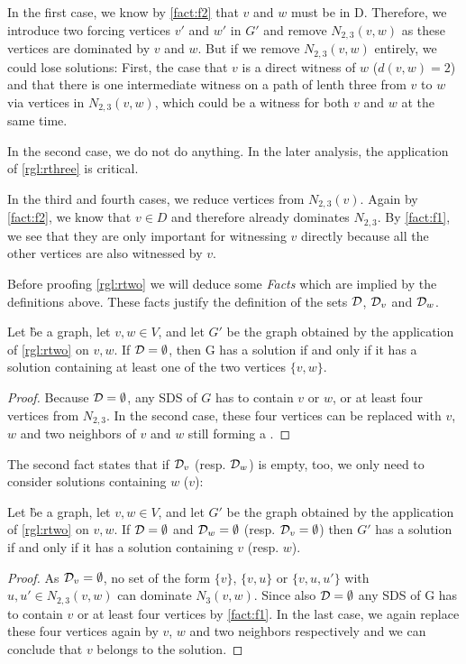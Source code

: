 In the first case, we know by \cref{fact:f2} that $v$ and $w$ must be in D. Therefore, we introduce two forcing vertices $v'$ and $w'$ in $G'$ and remove $N_{2,3}(v,w)$ as these vertices are dominated by $v$ and $w$.
But if we remove $N_{2,3}(v,w)$ entirely, we could lose solutions: First, the case that $v$ is a direct witness of $w$ ($d(v,w) = 2$) and that there is one intermediate witness on a path of lenth three from $v$ to $w$ via vertices in $N_{2,3}(v,w)$, which could be a witness for both $v$ and $w$ at the same time. 

In the second case, we do not do anything. In the later analysis, the application of \cref{rgl:rthree} is critical.

In the third and fourth cases, we reduce vertices from $N_{2,3}(v)$. Again by \cref{fact:f2}, we know that $v \in D$ and therefore already dominates $N_{2,3}$. By \cref{fact:f1}, we see that they are only important for witnessing $v$ directly because all the other vertices are also witnessed by $v$. 


Before proofing \cref{rgl:rtwo} we will deduce some \textit{Facts} which are implied by the definitions above. These facts justify the definition of the sets $\mathcal{D}$, $\mathcal{D}_{v}$ and $\mathcal{D}_{w}$.

\begin{fact}\label{fact:f1}
    Let \G be a graph, let $v,w \in V$, and let $G'$ be the graph obtained by the application of \cref{rgl:rtwo} on $v,w$. If $\mathcal{D} = \emptyset$, then G has a solution if and only if it has a solution containing at least one of the two vertices $\{v,w \}$.
\end{fact}
\begin{proof}
Because $\mathcal{D} = \emptyset$, any SDS of $G$ has to contain $v$ or $w$, or at least four vertices from $N_{2,3}$. In the second case, these four vertices can be replaced with $v$, $w$ and two neighbors of $v$ and $w$ still forming a \sdom.
\end{proof}

The second fact states that if  $\mathcal{D}_{v}$ (resp. $\mathcal{D}_{w}$) is empty, too, we only need to consider solutions containing $w$ ($v$):

\begin{fact}\label{fact:f2}
    Let \G be a graph, let $v,w \in V$, and let $G'$ be the graph obtained by the application of \cref{rgl:rtwo} on $v, w$. If $\mathcal{D} = \emptyset$ and $\mathcal{D}_{w} = \emptyset$ (resp. $\mathcal{D}_{v} = \emptyset$) then $G'$ has a solution if and only if it has a solution containing $v$ (resp. $w$).
\end{fact}
\begin{proof}
As $\mathcal{D}_{v} = \emptyset$, no set of the form $\{v\}$, $\{v, u\}$ or $\{v, u, u'\}$ with $u, u' \in N_{2,3}(v,w)$ can dominate $N_3(v,w)$. Since also $\mathcal{D} = \emptyset$ any SDS of G has to contain $v$ or at least four vertices by \cref{fact:f1}. In the last case, we again replace these four vertices again by $v$, $w$ and two neighbors respectively and we can conclude that $v$ belongs to the solution.
\end{proof}

